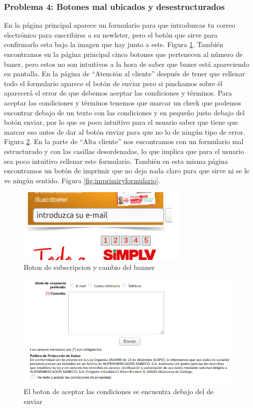 \documentclass[a4paper,11pt]{article}
\begin{document}
\subsubsection{Problema 4: Botones mal ubicados y desestructurados}
En la página principal aparece un formulario para que introduzcas tu correo electrónico para suscribirse a su newleter, pero el botón que sirve para confirmarlo esta bajo la imagen que hay junto a este. Figura \ref{fig:bannerysubs}.
También encontramos en la página principal cinco botones que pertenecen al número de baner, pero estos no son intuitivos a la hora de saber que baner está apareciendo en pantalla. En la página de “Atención al cliente” después de tener que rellenar todo el formulario aparece el botón de enviar pero si pinchamos sobre él aparecerá el error de que debemos aceptar las condiciones y términos. Para aceptar las condiciones y términos tenemos que marcar un check que podemos encontrar debajo de un texto con las condiciones y en pequeño justo debajo del botón enviar, por lo que es poco intuitivo para el usuario saber que tiene que marcar eso antes de dar al botón enviar para que no lo de ningún tipo de error. Figura \ref{fig:formulariocondiciones}.
En la parte de “Alta cliente” nos encontramos con un formulario mal estructurado y con las casillas desordenadas, lo que implica que para el usuario sea poco intuitivo rellenar este formulario. También en esta misma página encontramos un botón de imprimir que no deja nada claro para que sirve ni se le ve ningún sentido. Figura \ref{fig:imprimiryformulario}.


\begin{figure}[h!]
 \centering
 \includegraphics[scale=0.5]{bannerysubs.png}
 \caption{Boton de subscripcion y cambio del banner}
 \label{fig:bannerysubs}
\end{figure}

\begin{figure}[h!]
 \centering
 \includegraphics[scale=0.5]{formulariocondiciones.png}
 \caption{El boton de aceptar las condiciones se encuentra debajo del de enviar}
 \label{fig:formulariocondiciones}
\end{figure}
\end{document}
